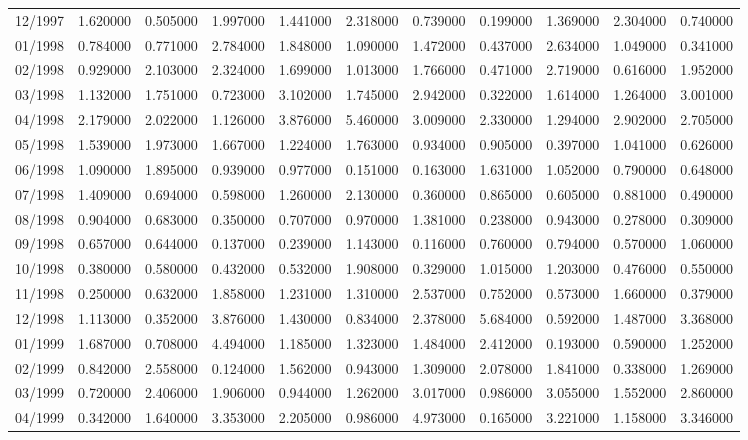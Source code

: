 \begin{tabular}{lrrrrrrrrrr}
12/1997 & 1.620000 & 0.505000 & 1.997000 & 1.441000 & 2.318000 & 0.739000 & 0.199000 & 1.369000 & 2.304000 & 0.740000 \\
01/1998 & 0.784000 & 0.771000 & 2.784000 & 1.848000 & 1.090000 & 1.472000 & 0.437000 & 2.634000 & 1.049000 & 0.341000 \\
02/1998 & 0.929000 & 2.103000 & 2.324000 & 1.699000 & 1.013000 & 1.766000 & 0.471000 & 2.719000 & 0.616000 & 1.952000 \\
03/1998 & 1.132000 & 1.751000 & 0.723000 & 3.102000 & 1.745000 & 2.942000 & 0.322000 & 1.614000 & 1.264000 & 3.001000 \\
04/1998 & 2.179000 & 2.022000 & 1.126000 & 3.876000 & 5.460000 & 3.009000 & 2.330000 & 1.294000 & 2.902000 & 2.705000 \\
05/1998 & 1.539000 & 1.973000 & 1.667000 & 1.224000 & 1.763000 & 0.934000 & 0.905000 & 0.397000 & 1.041000 & 0.626000 \\
06/1998 & 1.090000 & 1.895000 & 0.939000 & 0.977000 & 0.151000 & 0.163000 & 1.631000 & 1.052000 & 0.790000 & 0.648000 \\
07/1998 & 1.409000 & 0.694000 & 0.598000 & 1.260000 & 2.130000 & 0.360000 & 0.865000 & 0.605000 & 0.881000 & 0.490000 \\
08/1998 & 0.904000 & 0.683000 & 0.350000 & 0.707000 & 0.970000 & 1.381000 & 0.238000 & 0.943000 & 0.278000 & 0.309000 \\
09/1998 & 0.657000 & 0.644000 & 0.137000 & 0.239000 & 1.143000 & 0.116000 & 0.760000 & 0.794000 & 0.570000 & 1.060000 \\
10/1998 & 0.380000 & 0.580000 & 0.432000 & 0.532000 & 1.908000 & 0.329000 & 1.015000 & 1.203000 & 0.476000 & 0.550000 \\
11/1998 & 0.250000 & 0.632000 & 1.858000 & 1.231000 & 1.310000 & 2.537000 & 0.752000 & 0.573000 & 1.660000 & 0.379000 \\
12/1998 & 1.113000 & 0.352000 & 3.876000 & 1.430000 & 0.834000 & 2.378000 & 5.684000 & 0.592000 & 1.487000 & 3.368000 \\
01/1999 & 1.687000 & 0.708000 & 4.494000 & 1.185000 & 1.323000 & 1.484000 & 2.412000 & 0.193000 & 0.590000 & 1.252000 \\
02/1999 & 0.842000 & 2.558000 & 0.124000 & 1.562000 & 0.943000 & 1.309000 & 2.078000 & 1.841000 & 0.338000 & 1.269000 \\
03/1999 & 0.720000 & 2.406000 & 1.906000 & 0.944000 & 1.262000 & 3.017000 & 0.986000 & 3.055000 & 1.552000 & 2.860000 \\
04/1999 & 0.342000 & 1.640000 & 3.353000 & 2.205000 & 0.986000 & 4.973000 & 0.165000 & 3.221000 & 1.158000 & 3.346000 \\

\end{tabular}
